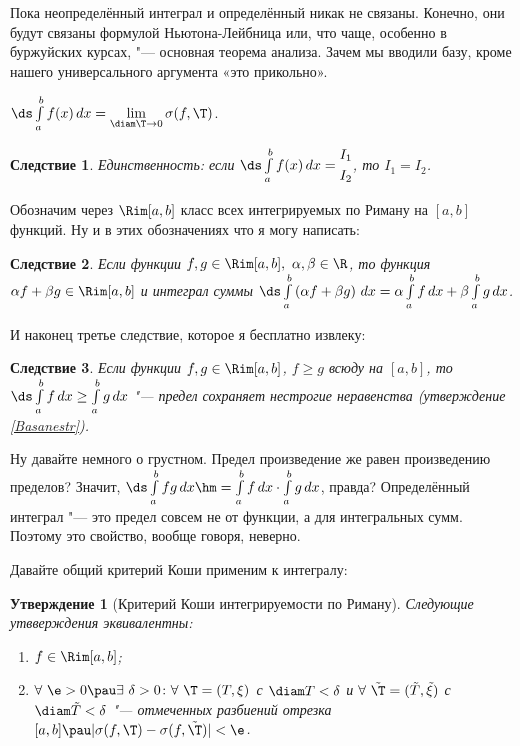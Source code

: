 \documentclass[a4paper,10pt,twoside]{article}
\newtheorem{Sl}{Следствие}[section]
\newtheorem{Ut}{Утверждение}[section]
\newenvironment{Zam}
     	{\par\noindent{\textbf{Замечание.}}}{}
\begin{document}
 Пока неопределённый интеграл и определённый никак не связаны. Конечно, они будут связаны формулой Ньютона-Лейбница или, что чаще, особенно в буржуйских курсах, "--- основная
 теорема анализа. Зачем мы вводили базу, кроме нашего универсального аргумента «это прикольно».
 
 \begin{Zam}
 	$\ds\int\limits_a^bf(x)\,dx=\lim\limits_{\diam\T\to0}\sigma(f,\T)$.
 \end{Zam}
 
 \begin{Sl}
 	Единственность: если $\ds\int\limits_a^bf(x)\,dx=\begin{aligned}
 		I_1\\ I_2
 	\end{aligned}$, то $I_1=I_2$.
 \end{Sl}
 
 Обозначим через $\Rim[a,b]$ класс всех интегрируемых по Риману на $[a,b]$ функций. Ну и в этих обозначениях что я
 могу написать:
 
 \begin{Sl}
 	Если функции $f,g\in \Rim[a,b],\ \alpha,\beta\in\R$, то функция $\alpha f+\beta g\in\Rim[a,b]$ и интеграл суммы
 	$\ds\int\limits_a^b\left(\alpha f+\beta g\right)\,dx=\alpha\int\limits_a^bf\,dx+\beta\int\limits_a^bg\,dx$.
 \end{Sl}
 
 И наконец третье следствие, которое я бесплатно извлеку:
 
 \begin{Sl}\label{Rimnestr}
 	Если функции $f,g\in\Rim[a,b]$, $f\geq g$ всюду на $[a,b]$, то $\ds\int\limits_a^bf\,dx\geq\int\limits_a^bg\,dx$ "--- предел
 	сохраняет нестрогие неравенства (утверждение \ref{Basanestr}).
 \end{Sl}
 
 Ну давайте немного о грустном. Предел произведение же равен произведению пределов? Значит, $\ds\int\limits_a^bfg\,dx\hm=
 \int\limits_a^bf\,dx\cdot\int\limits_a^bg\,dx$, правда? Определённый интеграл "--- это предел совсем не от
 функции, а для интегральных сумм. Поэтому это свойство, вообще говоря, неверно.
 
 Давайте общий критерий Коши применим к интегралу:
 
 \begin{Ut}[Критерий Коши интегрируемости по Риману] Следующие утвверждения эквивалентны:
 \begin{enumerate}
   \item $f\in\Rim[a,b]$;
   \item $\forall\  \e>0\pau\exists\  \delta>0\colon\forall\ \T=(T,\xi)$ с $\diam T<\delta$ и $\forall\ \tilde\T=(\tilde T,\tilde\xi)$ с $\diam\tilde T<\delta$
   "--- отмеченных разбиений отрезка $[a,b]\pau |\sigma(f,\T)-\sigma(f,\tilde\T)|<\e$.
 \end{enumerate}
 	
 \end{Ut}
 
\end{document}
